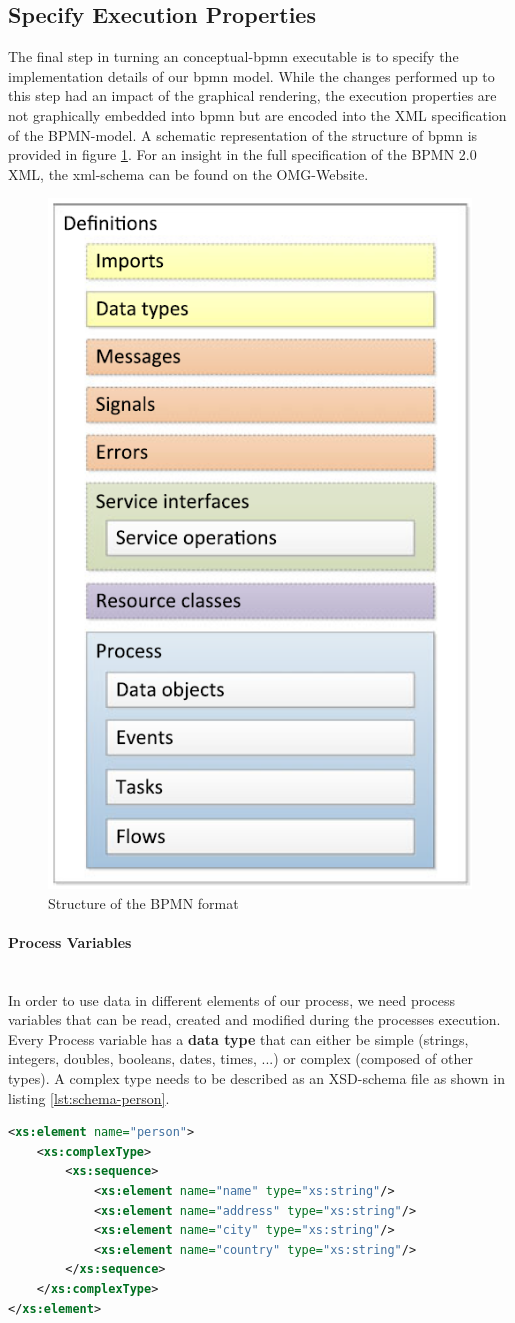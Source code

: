 \subsection{Specify Execution Properties}
The final step in turning an \gls{conceptual-bpmn} executable is to specify the implementation details of our \gls{bpmn} model. While the changes performed up to this step had an impact of the graphical rendering, the execution properties are not graphically embedded into \gls{bpmn} but are encoded into the \gls{XML} specification of the BPMN-model. \cite{fundamentals} A schematic representation of the structure of \gls{bpmn} is provided in figure \ref{fig:bpmn-schema}. For an insight in the full specification of the BPMN 2.0 XML, the \gls{xml}-schema can be found on the OMG-Website\cite{BPMN-xml-spec}. 
\begin{figure}[H]
		\centering
		\includegraphics[width=0.3\columnwidth]{graphics/bpmn-schema}
		\caption{Structure of the BPMN format \cite{fundamentals}} 
		\label{fig:bpmn-schema} 
\end{figure}


\paragraph{Process Variables}~\\
In order to use data in different elements of our process, we need process variables that can be read, created and modified during the processes execution. Every Process variable has a \textbf{data type} that can either be simple (strings, integers, doubles, booleans, dates, times, ...) or complex (composed of other types). A complex type needs to be described as an \gls{XSD}-schema file as shown in listing \ref{lst:schema-person}. 

\begin{lstlisting}[language=xml,caption={The \gls{xml}-Schema Definiton for a complex type 'person'},captionpos=b, label={lst:schema-person}]
<xs:element name="person">
	<xs:complexType>
		<xs:sequence>
			<xs:element name="name" type="xs:string"/>
			<xs:element name="address" type="xs:string"/>
			<xs:element name="city" type="xs:string"/>
			<xs:element name="country" type="xs:string"/>
		</xs:sequence>
	</xs:complexType>
</xs:element>
\end{lstlisting}

